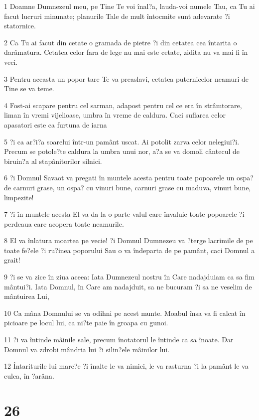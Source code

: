 \par 1 Doamne Dumnezeul meu, pe Tine Te voi înal?a, lauda-voi numele Tau, ca Tu ai facut lucruri minunate; planurile Tale de mult întocmite sunt adevarate ?i statornice.
\par 2 Ca Tu ai facut din cetate o gramada de pietre ?i din cetatea cea întarita o darâmatura. Cetatea celor fara de lege nu mai este cetate, zidita nu va mai fi în veci.
\par 3 Pentru aceasta un popor tare Te va preaslavi, cetatea puternicelor neamuri de Tine se va teme.
\par 4 Fost-ai scapare pentru cel sarman, adapost pentru cel ce era în strâmtorare, liman în vremi vijelioase, umbra în vreme de caldura. Caci suflarea celor apasatori este ca furtuna de iarna
\par 5 ?i ca ar?i?a soarelui într-un pamânt uscat. Ai potolit zarva celor nelegiui?i. Precum se potole?te caldura la umbra unui nor, a?a se va domoli cântecul de biruin?a al stapânitorilor silnici.
\par 6 ?i Domnul Savaot va pregati în muntele acesta pentru toate popoarele un ospa? de carnuri grase, un ospa? cu vinuri bune, carnuri grase cu maduva, vinuri bune, limpezite!
\par 7 ?i în muntele acesta El va da la o parte valul care învaluie toate popoarele ?i perdeaua care acopera toate neamurile.
\par 8 El va înlatura moartea pe vecie! ?i Domnul Dumnezeu va ?terge lacrimile de pe toate fe?ele ?i ru?inea poporului Sau o va îndeparta de pe pamânt, caci Domnul a grait!
\par 9 ?i se va zice în ziua aceea: Iata Dumnezeul nostru în Care nadajduiam ca sa fim mântui?i. Iata Domnul, în Care am nadajduit, sa ne bucuram ?i sa ne veselim de mântuirea Lui,
\par 10 Ca mâna Domnului se va odihni pe acest munte. Moabul însa va fi calcat în picioare pe locul lui, ca ni?te paie în groapa cu gunoi.
\par 11 ?i va întinde mâinile sale, precum înotatorul le întinde ca sa înoate. Dar Domnul va zdrobi mândria lui ?i silin?ele mâinilor lui.
\par 12 Întariturile lui mare?e ?i înalte le va nimici, le va rasturna ?i la pamânt le va culca, în ?arâna.

\chapter{26}

